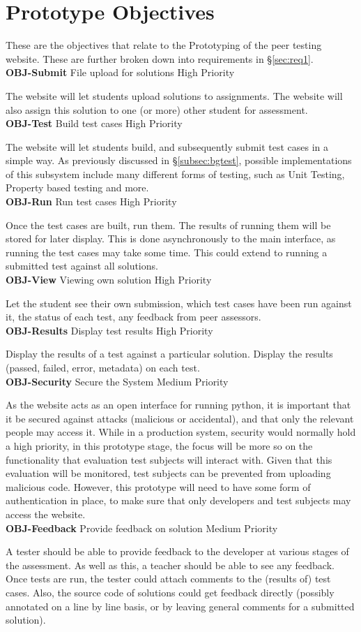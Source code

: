 \documentclass[a4paper,11pt]{report}
\newcommand{\objitem}[4]{\textbf{\\OBJ-#1} \quad #2 \hfill #3\par#4}
\begin{document}
\section{Prototype Objectives}
These are the objectives that relate to the Prototyping of the peer testing website. These are further broken down into requirements in \S\ref{sec:req1}.
\objitem{Submit}{File upload for solutions}{High Priority}{The website will let students upload solutions to assignments. The website will also assign this solution to one (or more) other student for assessment.}
\objitem{Test}{Build test cases}{High Priority}{The website will let students build, and subsequently submit test cases in a simple way. As previously discussed in \S\ref{subsec:bgtest}, possible implementations of this subsystem include many different forms of testing, such as Unit Testing, Property based testing and more.}
\objitem{Run}{Run test cases}{High Priority}{Once the test cases are built, run them. The results of running them will be stored for later display. This is done asynchronously to the main interface, as running the test cases may take some time. This could extend to running a submitted test against all solutions.}
\objitem{View}{Viewing own solution}{High Priority}{Let the student see their own submission, which test cases have been run against it, the status of each test, any feedback from peer assessors.}
\objitem{Results}{Display test results}{High Priority}{Display the results of a test against a particular solution. Display the results (passed, failed, error, metadata) on each test.}
\objitem{Security}{Secure the System}{Medium Priority}{As the website acts as an open interface for running python, it is important that it be secured against attacks (malicious or accidental), and that only the relevant people may access it. While in a production system, security would normally hold a high priority, in this prototype stage, the focus will be more so on the functionality that evaluation test subjects will interact with. Given that this evaluation will be monitored, test subjects can be prevented from uploading malicious code. However, this prototype will need to have some form of authentication in place, to make sure that only developers and test subjects may access the website.}
\objitem{Feedback}{Provide feedback on solution}{Medium Priority}{A tester should be able to provide feedback to the developer at various stages of the assessment. As well as this, a teacher should be able to see any feedback. Once tests are run, the tester could attach comments to the (results of) test cases. Also, the source code of solutions could get feedback directly (possibly annotated on a line by line basis, or by leaving general comments for a submitted solution).}
\end{document}
